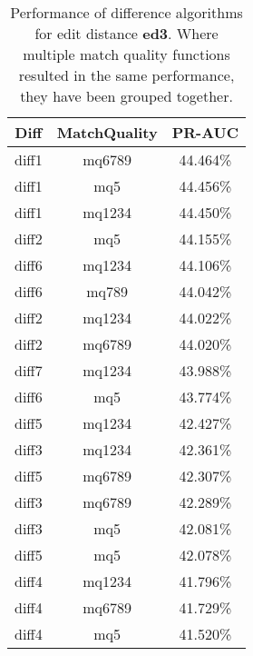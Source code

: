 \begin{table}[tbph]
\begin{center}
\begin{tabular}{|c|c||c|}
\hline
Diff & MatchQuality & PR-AUC  \\
\hline
\hline
diff1 & mq6789 & 44.464\% \\
diff1 & mq5 & 44.456\% \\
diff1 & mq1234 & 44.450\% \\
diff2 & mq5 & 44.155\% \\
diff6 & mq1234 & 44.106\% \\
diff6 & mq789 & 44.042\% \\
diff2 & mq1234 & 44.022\% \\
diff2 & mq6789 & 44.020\% \\
diff7 & mq1234 & 43.988\% \\
diff6 & mq5 & 43.774\% \\
diff5 & mq1234 & 42.427\% \\
diff3 & mq1234 & 42.361\% \\
diff5 & mq6789 & 42.307\% \\
diff3 & mq6789 & 42.289\% \\
diff3 & mq5 & 42.081\% \\
diff5 & mq5 & 42.078\% \\
diff4 & mq1234 & 41.796\% \\
diff4 & mq6789 & 41.729\% \\
diff4 & mq5 & 41.520\% \\
\hline
\end{tabular}
\end{center}
\caption{Performance of difference algorithms for
  edit distance \textbf{ed3}.  Where multiple match
  quality functions resulted in the same performance, they
  have been grouped together.}
\label{tab:editlongbyed3}
\end{table}
